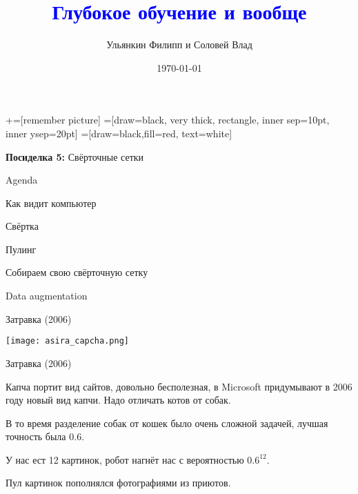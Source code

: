 \documentclass[notes,12pt, aspectratio=169]{beamer}
\title[]{\textcolor{blue}{Глубокое обучение и вообще}}
\author{Ульянкин Филипп и Соловей Влад}
\date{\today}
\newenvironment{wideitemize}{\itemize\addtolength{\itemsep}{10pt}}{\enditemize}
\begin{document}
\newcommand\marktopleft[1]{%
    \tikz[overlay,remember picture] 
        \node (marker-#1-a) at (-.3em,.3em) {};%
}
\newcommand\markbottomright[2]{%
    \tikz[overlay,remember picture] 
        \node (marker-#1-b) at (0em,0em) {};%
}
+=[remember picture] 
 =[draw=black, very thick, rectangle, inner sep=10pt, inner ysep=20pt]
 =[draw=black,fill=red, text=white]


\begin{frame}
\maketitle
\centering \textbf{\color{blue} Посиделка 5:} Свёрточные сетки
\end{frame}



\begin{frame}{Agenda}
\begin{wideitemize}
	\item Как видит компьютер
	\item Свёртка
	\item Пулинг
	\item Собираем свою свёрточную сетку 
	\item Data augmentation 
\end{wideitemize} 
\end{frame}


\begin{frame}{Затравка (2006)}
\begin{center}
	\texttt{[image: asira\_capcha.png]}
\end{center}
\end{frame}


\begin{frame}{Затравка (2006)}
\begin{wideitemize}
	\item Капча портит вид сайтов, довольно бесполезная, в Microsoft придумывают в 2006 году новый вид капчи. Надо отличать котов от собак. 
	\item В то время разделение собак от кошек было очень сложной задачей, лучшая точность была $0.6$. 
	\item У нас ест 12 картинок, робот нагнёт нас с вероятностью $0.6^{12}$. 
	\item Пул картинок пополнялся фотографиями из приютов. 
\end{wideitemize} 
\end{frame}
\end{document}
